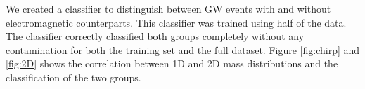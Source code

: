 We created a classifier to distinguish between GW events with and without electromagnetic counterparts. This classifier was trained using half of the data. The classifier correctly classified both groups completely without any contamination for both the training set and the full dataset. Figure \ref{fig:chirp} and \ref{fig:2D} shows the correlation between 1D and 2D mass distributions and the classification of the two groups.